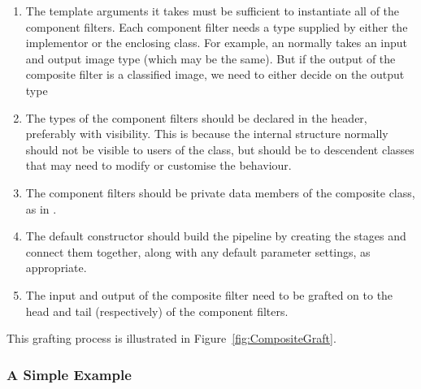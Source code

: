 \begin{enumerate}

\item The template arguments it takes must be sufficient to instantiate all
  of the component filters.  Each component filter needs a type supplied by
  either the implementor or the enclosing class.  For example, an
   normally takes an input and output image type
  (which may be the same).  But if the output of the composite filter is a
  classified image, we need to either decide on the output type

\item The types of the component filters should be declared in the header,
  preferably with  visibility.  This is because the
  internal structure normally should not be visible to users of the class,
  but should be to descendent classes that may need to modify or customise
  the behaviour. 

\item The component filters should be private data members of the composite
  class, as in . 

\item The default constructor should build the pipeline by creating the
  stages and connect them together, along with any default parameter
  settings, as appropriate. 

\item The input and output of the composite filter need to be grafted on to
  the head and tail (respectively) of the component filters. 

\end{enumerate}

This grafting process is illustrated in Figure~\ref{fig:CompositeGraft}. 

\subsubsection{A Simple Example}



